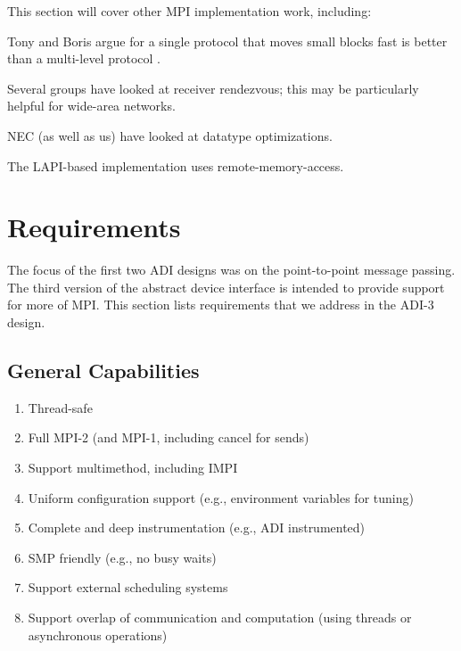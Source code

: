 \documentclass{article}
\begin{document}
This section will cover other MPI implementation work, including:

Tony and Boris argue for a single protocol that moves small blocks fast is
better than a multi-level protocol \cite{techreport}.

Several groups have looked at receiver rendezvous; this may be particularly
helpful for wide-area networks.

NEC (as well as us) have looked at datatype optimizations.

The LAPI-based implementation uses remote-memory-access.

\section{Requirements}
The focus of the first two ADI designs was on the point-to-point message
passing.  
The third version of the abstract device interface is intended to provide
support for more of MPI.  
This section lists requirements that we address in the ADI-3 design.

\subsection{General Capabilities}
\begin{enumerate}
\item Thread-safe
\item Full MPI-2 (and MPI-1, including cancel for sends)
\item Support multimethod, including IMPI
\item Uniform configuration support (e.g., environment variables for tuning)
\item Complete and deep instrumentation (e.g., ADI instrumented)
\item SMP friendly (e.g., no busy waits)
\item Support external scheduling systems
\item Support overlap of communication and computation (using threads or
  asynchronous operations)
\end{enumerate}
\end{document}
